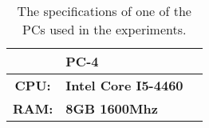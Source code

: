 \begin{table}[htb!]
    \centering
    \begin{tabular}{cp{}p{}}
        \toprule
        \textbf{} & \textbf{PC-4} \\
        \midrule
        \textbf{CPU:} & \textbf{Intel Core I5-4460} \\
        \textbf{RAM:} & \textbf{8GB 1600Mhz} \\
        \bottomrule
    \end{tabular}
    \caption{The specifications of one of the PCs used in the experiments.}
    \label{tab:pc4-specs}
\end{table}